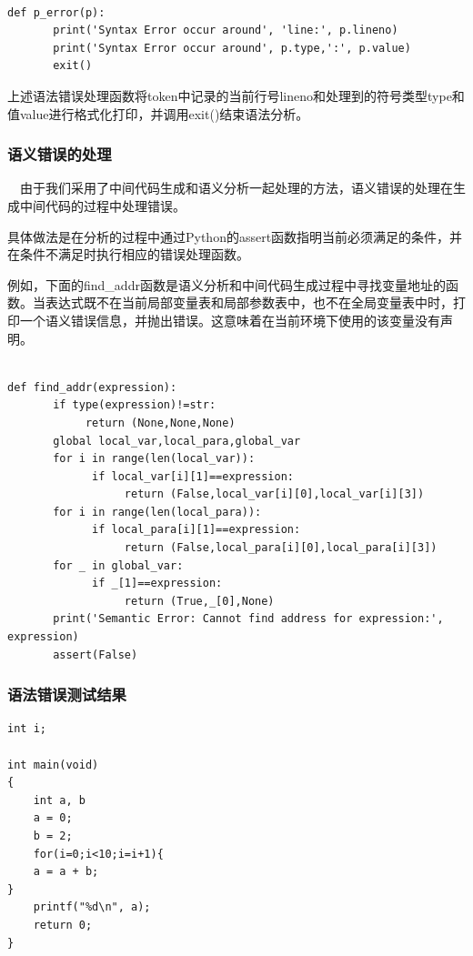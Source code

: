 \documentclass{article}
\begin{document}
\begin{verbatim}

def p_error(p):
       print('Syntax Error occur around', 'line:', p.lineno)
       print('Syntax Error occur around', p.type,':', p.value)
       exit()

\end{verbatim}

上述语法错误处理函数将token中记录的当前行号lineno和处理到的符号类型type和值value进行格式化打印，并调用exit()结束语法分析。

\subsubsection{语义错误的处理}

\quad\ \ 由于我们采用了中间代码生成和语义分析一起处理的方法，语义错误的处理在生成中间代码的过程中处理错误。

具体做法是在分析的过程中通过Python的assert函数指明当前必须满足的条件，并在条件不满足时执行相应的错误处理函数。

例如，下面的find\_addr函数是语义分析和中间代码生成过程中寻找变量地址的函数。当表达式既不在当前局部变量表和局部参数表中，也不在全局变量表中时，打印一个语义错误信息，并抛出错误。这意味着在当前环境下使用的该变量没有声明。

\begin{verbatim}

def find_addr(expression):
       if type(expression)!=str:
            return (None,None,None)
       global local_var,local_para,global_var
       for i in range(len(local_var)):
             if local_var[i][1]==expression:
                  return (False,local_var[i][0],local_var[i][3])
       for i in range(len(local_para)):
             if local_para[i][1]==expression:
                  return (False,local_para[i][0],local_para[i][3])
       for _ in global_var:
             if _[1]==expression:
                  return (True,_[0],None) 
       print('Semantic Error: Cannot find address for expression:', expression)
       assert(False)

\end{verbatim}

\subsubsection{语法错误测试结果}

\begin{verbatim}
int i;

int main(void)
{
    int a, b
    a = 0;
    b = 2;
    for(i=0;i<10;i=i+1){
    a = a + b;
}
    printf("%d\n", a);
    return 0;
}
\end{verbatim}
\end{document}
